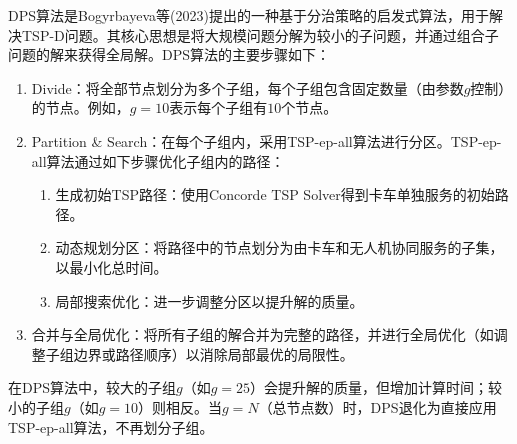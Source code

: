 DPS算法是Bogyrbayeva等(2023)\cite{bogyrbayevaDeepReinforcementLearning2023}提出的一种基于分治策略的启发式算法，用于解决TSP-D问题。其核心思想是将大规模问题分解为较小的子问题，并通过组合子问题的解来获得全局解。DPS算法的主要步骤如下：
\begin{enumerate}
    \item Divide：将全部节点划分为多个子组，每个子组包含固定数量（由参数$g$控制）的节点。例如，$g = 10$表示每个子组有$10$个节点。
    \item Partition \& Search：在每个子组内，采用TSP-ep-all算法\cite{agatzOptimizationApproachesTraveling2018}进行分区。TSP-ep-all算法通过如下步骤优化子组内的路径：
    \begin{enumerate}
        \item 生成初始TSP路径：使用Concorde TSP Solver得到卡车单独服务的初始路径。
        \item 动态规划分区：将路径中的节点划分为由卡车和无人机协同服务的子集，以最小化总时间。
        \item 局部搜索优化：进一步调整分区以提升解的质量。
    \end{enumerate}
    \item 合并与全局优化：将所有子组的解合并为完整的路径，并进行全局优化（如调整子组边界或路径顺序）以消除局部最优的局限性。
\end{enumerate}

在DPS算法中，较大的子组$g$（如$g = 25$）会提升解的质量，但增加计算时间；较小的子组$g$（如$g = 10$）则相反。当$g = N\text{（总节点数）}$时，DPS退化为直接应用TSP-ep-all算法，不再划分子组。

